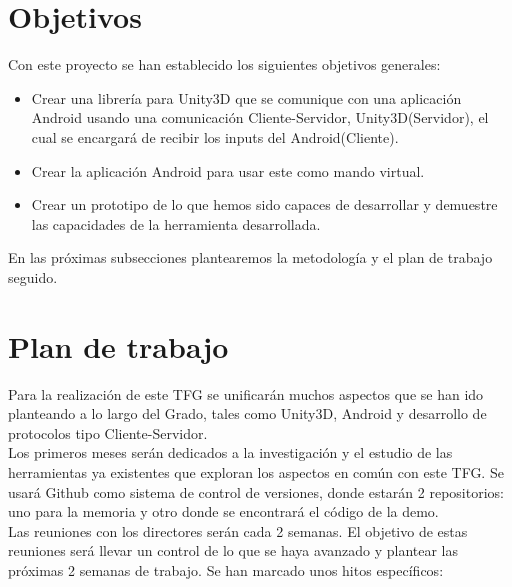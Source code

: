 \section{Objetivos}
\label{cap3:sec:obejtivos}

Con este proyecto se han establecido los siguientes objetivos generales:

\begin{itemize}
\item Crear una librer\'ia para Unity3D que se comunique con una aplicaci\'on Android usando una comunicaci\'on Cliente-Servidor, Unity3D(Servidor), el cual se encargar\'a de recibir los inputs del Android(Cliente).
\item Crear la aplicaci\'on Android para usar este como mando virtual.
\item Crear un prototipo de lo que hemos sido capaces de desarrollar y demuestre las capacidades de la herramienta desarrollada.
\end{itemize}

En las pr\'oximas subsecciones plantearemos la metodolog\'ia y el plan de trabajo seguido.


\section{Plan de trabajo}
\label{cap3:sec:plandetrabajo}

Para la realizaci\'on de este TFG se unificar\'an muchos aspectos que se han ido planteando a lo largo del Grado, tales como Unity3D, Android y desarrollo de protocolos tipo Cliente-Servidor.
\\
Los primeros meses ser\'an dedicados a la investigaci\'on y el estudio de las herramientas ya existentes que exploran los aspectos en com\'un con este TFG. Se usar\'a Github como sistema de control de versiones, donde estar\'an 2 repositorios: uno para la memoria y otro donde se encontrar\'a el c\'odigo de la demo. 
\\
Las reuniones con los directores ser\'an cada 2 semanas. El objetivo de estas reuniones ser\'a llevar un control de lo que se haya avanzado y plantear las pr\'oximas 2 semanas de trabajo.
Se han marcado unos hitos espec\'ificos:


